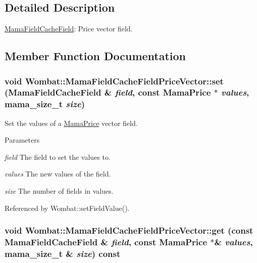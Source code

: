 \subsection{Detailed Description}
\hyperlink{classWombat_1_1MamaFieldCacheField}{MamaFieldCacheField}: Price vector field. 

\subsection{Member Function Documentation}
\hypertarget{classWombat_1_1MamaFieldCacheFieldPriceVector_adb2993b30ca000aa2cfd7a77ad3be899}{
\subsubsection[{set}]{\setlength{\rightskip}{0pt plus 5cm}void Wombat::MamaFieldCacheFieldPriceVector::set ({\bf MamaFieldCacheField} \& {\em field}, \/  const {\bf MamaPrice} $\ast$ {\em values}, \/  {\bf mama\_\-size\_\-t} {\em size})}}
\label{classWombat_1_1MamaFieldCacheFieldPriceVector_adb2993b30ca000aa2cfd7a77ad3be899}


Set the values of a \hyperlink{classWombat_1_1MamaPrice}{MamaPrice} vector field. 
\begin{DoxyParams}{Parameters}
\item[{\em field}]The field to set the values to. \item[{\em values}]The new values of the field. \item[{\em size}]The number of fields in {\ttfamily values}. \end{DoxyParams}


Referenced by Wombat::setFieldValue().\hypertarget{classWombat_1_1MamaFieldCacheFieldPriceVector_ad3b8e536c41f426305213795471df26e}{
\subsubsection[{get}]{\setlength{\rightskip}{0pt plus 5cm}void Wombat::MamaFieldCacheFieldPriceVector::get (const {\bf MamaFieldCacheField} \& {\em field}, \/  const {\bf MamaPrice} $\ast$\& {\em values}, \/  {\bf mama\_\-size\_\-t} \& {\em size}) const}}
\label{classWombat_1_1MamaFieldCacheFieldPriceVector_ad3b8e536c41f426305213795471df26e}


